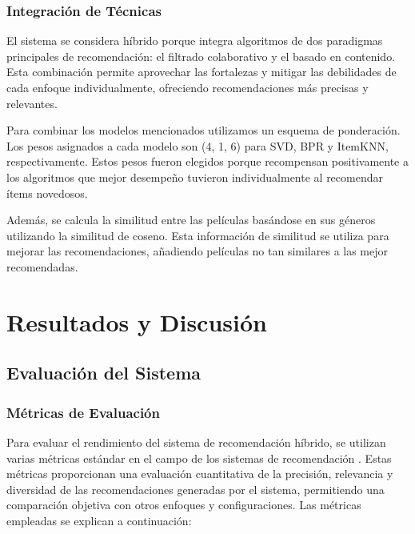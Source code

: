 \documentclass[a4paper,12pt]{report}
\begin{document}
\subsection{Integración de Técnicas}
El sistema se considera híbrido porque integra algoritmos de dos paradigmas principales de recomendación: el filtrado colaborativo y el basado en contenido. Esta combinación permite aprovechar las fortalezas y mitigar las debilidades de cada enfoque individualmente, ofreciendo recomendaciones más precisas y relevantes.

Para combinar los modelos mencionados utilizamos un esquema de ponderación. Los pesos asignados a cada modelo son (4, 1, 6) para SVD, BPR y ItemKNN, respectivamente. Estos pesos fueron elegidos porque recompensan positivamente a los algoritmos que mejor desempeño tuvieron individualmente al recomendar ítems novedosos.

Además, se calcula la similitud entre las películas basándose en sus géneros utilizando la similitud de coseno. Esta información de similitud se utiliza para mejorar las recomendaciones, añadiendo películas no tan similares a las mejor recomendadas.


\chapter{Resultados y Discusión}
    \section{Evaluación del Sistema}
        \subsection{Métricas de Evaluación}

        Para evaluar el rendimiento del sistema de recomendación híbrido, se utilizan varias métricas estándar en el campo de los sistemas de recomendación \cite{metrics}. Estas métricas proporcionan una evaluación cuantitativa de la precisión, relevancia y diversidad de las recomendaciones generadas por el sistema, permitiendo una comparación objetiva con otros enfoques y configuraciones.
        Las métricas empleadas se explican a continuación:
\end{document}
